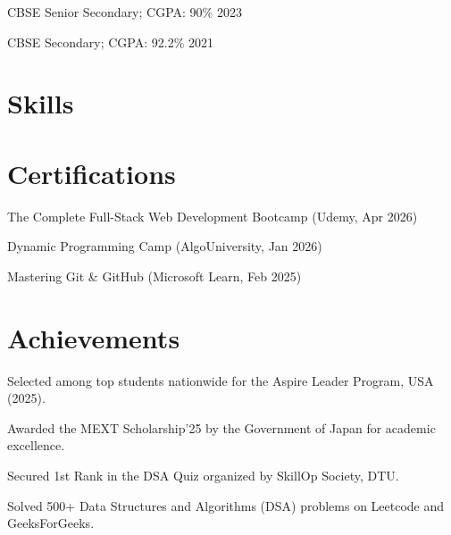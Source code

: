 \documentclass[a4paper,10pt]{article}
\begin{document}
\resumeSubheading
{CBSE}
{}
{Senior Secondary; CGPA: 90\%}
{2023}


\resumeSubheading
{CBSE}
{}
{Secondary; CGPA: 92.2\%}
{2021}


\section{Skills}




\section{Certifications}

\item The Complete Full-Stack Web Development Bootcamp (Udemy, Apr 2026)
\item Dynamic Programming Camp (AlgoUniversity, Jan 2026)
\item Mastering Git \& GitHub (Microsoft Learn, Feb 2025)

\section{Achievements}

\item Selected among top students nationwide for the Aspire Leader Program, USA (2025).
\item Awarded the MEXT Scholarship’25 by the Government of Japan for academic excellence.
\item Secured 1st Rank in the DSA Quiz organized by SkillOp Society, DTU.
\item Solved 500+ Data Structures and Algorithms (DSA) problems on Leetcode and GeeksForGeeks.
\end{document}
